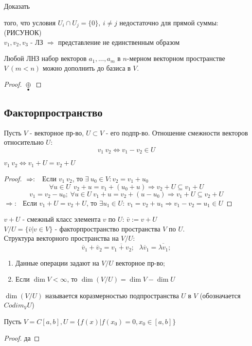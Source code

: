     \begin{exercise}
        Доказать
    \end{exercise} 
    \begin{example1} того, что условия $U_i \cap U_j = \{0\}, \ i \neq j$ недостаточно для прямой суммы: (РИСУНОК)\\
    $v_1,v_2,v_3$ - ЛЗ $\Longrightarrow $ представление не единственным образом
    \end{example1}
    \begin{lemma}
        Любой ЛНЗ набор векторов $a_1,...,a_m$ в $n$-мерном векторном пространстве $V \ (m < n)$ можно дополнить до базиса в $V$.  
    \end{lemma}
    \begin{proof}
        $\underset{\bullet }{\oplus}$ 
    \end{proof} 
    \subsection{Факторпространство}
    Пусть $V$ - векторное пр-во, $U \subset V$ - его подпр-во.
    Отношение смежности векторов относительно $U:$
    \[ v_1 ~ v_2 \Leftrightarrow v_1 - v_2 \in U\]
    \begin{subtheorem}
        $v_1 ~ v_2 \Leftrightarrow v_1 + U = v_2 + U$
    \end{subtheorem}
    \begin{proof}
        $\\\Rightarrow: \ \ $ Если $v_1 ~ v_2$, то $\exists \ u_0 \in V: v_2 = v_1 + u_0$
       \[\forall u \in U \ \ v_2 + u = v_1 + (u_0 + u) \Rightarrow v_2 + U \subseteq v_1 + U\]
        \[v_1 = v_2 - u_0; \ \forall u \in U \ v_1 + u = v_2 + (u - u_0) \Rightarrow v_1 + U \subseteq v_2 + U\]
        $\Rightarrow: \ \ $ Если $v_1 + U = v_2 + U$, то $\exists u_1 \in U: \ v_1 = v_2 + u_1 \Rightarrow v_1 - v_2 = u_1 \in U$
    \end{proof}
    $v + U$ - смежный класс элемента $v$ по $U$: $\bar{v} := v + U$\\
    $V / U = \{\bar{v}| v\in V\}$ - факторпространство пространства $V$ по $U$.\\
    Структура векторного пространства на $V / U$:
    \[\overline{v}_1 + \overline{v}_2 = \overline{v_1 + v_2}; \ \ \ \lambda\overline{v}_1 = \overline{\lambda v_1};\]
    \begin{theorem}
        \begin{enumerate}
            \item Данные операции задают на $V/U$ векторное пр-во;
            \item Если $\dim V < \infty$, то $\dim(V/U) = \dim V - \dim U$
        \end{enumerate}
    \end{theorem}
    $\dim (V/U)$ называется коразмерностью подпространства $U$ в $V$ (обозначается $Codim_{V} U$)
    \begin{example}
        Пусть $V = C[a, b], U = \{f(x)| f(x_0) = 0, x_0 \in [a, b]\}$

    \end{example}
    \begin{proof}
    да
    \end{proof}
